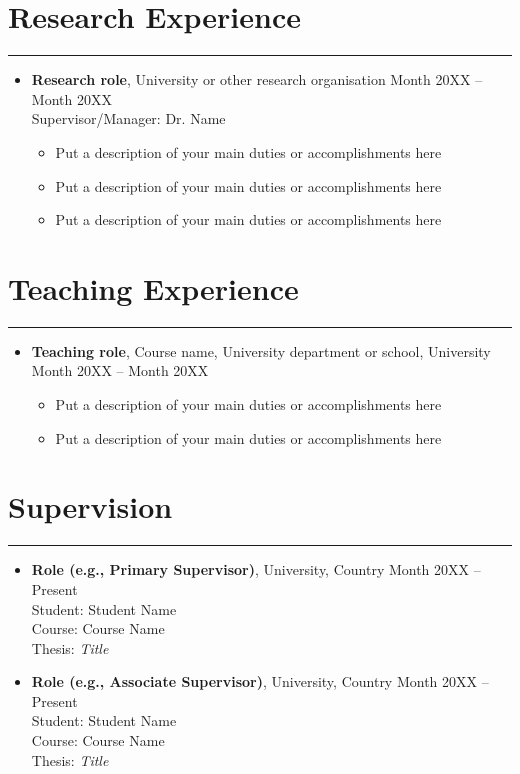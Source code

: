 \documentclass{article}
\begin{document}
\section*{Research Experience}
\hrule
\vspace{1em}
\begin{itemize}[leftmargin=*]
    \item[] \textbf{Research role}, University or other research organisation \hfill Month 20XX -- Month 20XX\\
    Supervisor/Manager: Dr. Name
    \begin{itemize}
        \item Put a description of your main duties or accomplishments here
        \item Put a description of your main duties or accomplishments here
        \item Put a description of your main duties or accomplishments here
    \end{itemize}
\end{itemize}

\section*{Teaching Experience}
\hrule
\vspace{1em}
\begin{itemize}[leftmargin=*]
    \item[] \textbf{Teaching role}, Course name, University department or school, University \hfill Month 20XX -- Month 20XX
    \begin{itemize}
        \item Put a description of your main duties or accomplishments here
        \item Put a description of your main duties or accomplishments here
    \end{itemize}
\end{itemize}

\section*{Supervision}
\hrule
\vspace{1em}
\begin{itemize}[leftmargin=*]
    \item[] \textbf{Role (e.g., Primary Supervisor)}, University, Country \hfill Month 20XX -- Present\\
    Student: Student Name\\
    Course: Course Name\\
    Thesis: \textit{Title}
    
    \item[] \textbf{Role (e.g., Associate Supervisor)}, University, Country \hfill Month 20XX -- Present\\
    Student: Student Name\\
    Course: Course Name\\
    Thesis: \textit{Title}
\end{itemize}
\end{document}
